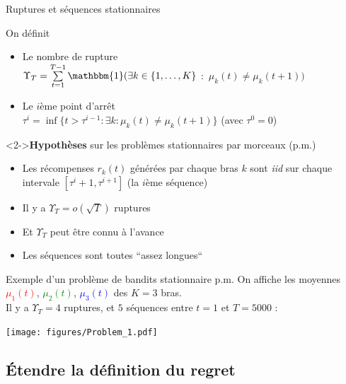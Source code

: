 \documentclass[11pt,french,ignorenonframetext,]{beamer}
\providecommand{\tightlist}{%
  \setlength{\itemsep}{0pt}\setlength{\parskip}{0pt}}
\begin{document}
\begin{frame}{Ruptures et séquences stationnaires}

  On définit

  \begin{itemize}
    \item
    Le nombre de rupture\\
    $\Upsilon_T = \sum\limits_{t=1}^{T-1} \mathbbm{1}(\exists k\in \{1,\dots,K\}$ $:$ $\mu_k(t) \neq \mu_k(t+1) )$

    \item
    Le $i$ème point d'arrêt\\
    $\tau^{i} = \inf\{t > \tau^{i-1} : \exists k : \mu_k(t) \neq \mu_k(t+1)\}$
    \hfill{} (avec $\tau^0=0$)
  \end{itemize}

  \begin{block}<2->{\textbf{Hypothèses} sur les problèmes stationnaires par morceaux (p.m.)}
    \begin{itemize}\tightlist
      \item Les récompenses $r_k(t)$ générées par chaque bras $k$ sont \alert{\emph{iid} sur chaque intervale} $[ \tau^{i} + 1, \tau^{i+1} ]$ (la $i$ème séquence)
      \item Il y a $\Upsilon_T = o(\sqrt{T})$ ruptures
      \item Et \alert{$\Upsilon_T$ peut être connu à l'avance}
      \item Les séquences sont toutes ``assez longues``
  \end{itemize}
\end{block}
\end{frame}


\begin{frame}[plain]{Exemple d'un problème de bandits stationnaire p.m.}
  On affiche les moyennes \textcolor{red}{$\mu_1(t)$}, \textcolor{green}{$\mu_2(t)$}, \textcolor{blue}{$\mu_3(t)$}
  des $K=3$ bras.\\
  Il y a $\Upsilon_T=4$ ruptures, et $5$ séquences entre $t=1$ et $T=5000$ :
  \begin{center}
    \texttt{[image: figures/Problem\_1.pdf]}
  \end{center}
\end{frame}


\subsection{\hfill{}Étendre la définition du regret\hfill{}}
\end{document}
